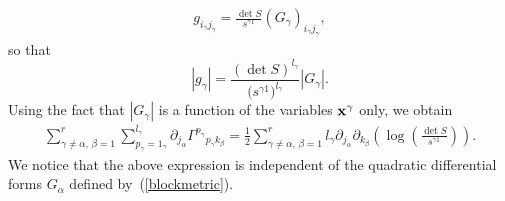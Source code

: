 \documentclass[pdftex]{sigma}
\numberwithin{equation}{section}
\newcommand{\jalpha}{j_{\alpha}}
\newcommand{\kbeta}{k_{\beta}}
\newcommand{\pgamma}{p_{\gamma}}
\newcommand{\igamma}{i_{\gamma}}
\newcommand{\jgamma}{j_{\gamma}}
\newcommand{\lgamma}{l_{\gamma}}
\begin{document}
\begin{gather}\label{Painleveblock}
g_{\igamma \jgamma}=\frac{\det S}{s^{\gamma 1}}(G_{\gamma})_{\igamma \jgamma},
\end{gather}
so that
\[
|g_{\gamma}|=\frac{(\det S)^{\lgamma}}{\big({s^{\gamma 1}}\big)^{\lgamma}}|G_{\gamma}|.
\]
Using the fact that $|G_{\gamma}|$ is a function of the variables ${\bf x}^{\gamma}$ only, we obtain
\begin{gather*}%
\sum_{\gamma \neq \alpha, \,\beta=1}^{r}\sum_{\pgamma=1_{\gamma}}^{\lgamma} \partial_{\jalpha}{\Gamma^{\pgamma}}_{\pgamma \kbeta}=\frac{1}{2}\sum_{\gamma \neq \alpha, \,\beta=1}^{r}\lgamma \partial_{\jalpha}\partial_{\kbeta}\left(\log\left(\frac{\det S}{s^{\gamma 1}}\right)\right).
\end{gather*}
We notice that the above expression is independent of the quadratic differential forms $G_{\alpha}$ defined by~(\ref{blockmetric}).
\end{document}
